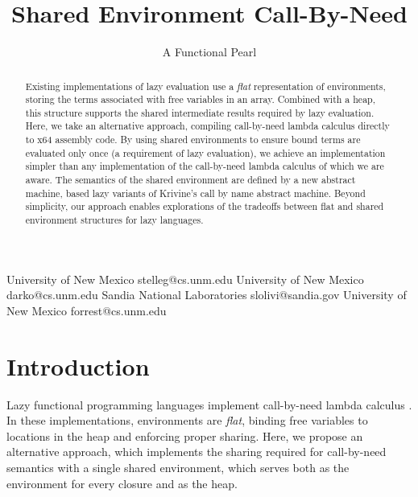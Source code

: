 \documentclass[preprint]{sigplanconf}
\begin{document}
\title{Shared Environment Call-By-Need}
\subtitle{A Functional Pearl}

           {University of New Mexico}
           {stelleg@cs.unm.edu}
           {University of New Mexico}
           {darko@cs.unm.edu}
           {Sandia National Laboratories}
           {slolivi@sandia.gov}
           {University of New Mexico}
           {forrest@cs.unm.edu}

\maketitle

\begin{abstract}
  Existing implementations of lazy evaluation use a \emph{flat}
  representation of environments, storing the terms associated with
  free variables in an array.  Combined with a heap, this structure
  supports the shared intermediate results required by lazy
  evaluation.  Here, we take an alternative approach, compiling
  call-by-need lambda calculus directly to x64 assembly code.  By
  using shared environments to ensure bound terms are evaluated only
  once (a requirement of lazy evaluation), we achieve an
  implementation simpler than any implementation of the
  call-by-need lambda calculus of which we are aware.  The semantics
  of the shared environment are defined by a new abstract machine, based
  lazy variants of Krivine's call by name abstract machine.  Beyond simplicity,
  our approach enables explorations of the tradeoffs between flat and shared
  environment structures for lazy languages.

\end{abstract}

\section{Introduction} \label{sec:intro}

Lazy functional programming languages implement call-by-need lambda calculus
\cite{ariola1995call}. In these implementations, environments are \emph{flat},
binding free variables to locations in the heap and enforcing proper sharing.
Here, we propose an alternative approach, which implements the sharing required
for call-by-need semantics with a single shared environment, which serves both
as the environment for every closure and as the heap. 
\end{document}
